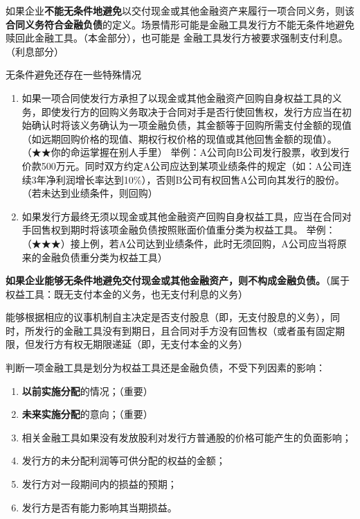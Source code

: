 \documentclass[UTF8,12pt]{ctexart}
\numberwithin{equation}{section} %
\numberwithin{figure}{section}
\numberwithin{table}{section}
\begin{document}
	如果企业\textbf{不能无条件地避免}以交付现金或其他金融资产来履行一项合同义务，则该\textbf{合同义务符合金融负债}的定义。场景情形可能是金融工具发行方不能无条件地避免赎回此金融工具。（本金部分），也可能是 金融工具发行方被要求强制支付利息。（利息部分）
	
	无条件避免还存在一些特殊情况
	\begin{enumerate}
		\item 如果一项合同使发行方承担了以现金或其他金融资产回购自身权益工具的义务，即使发行方的回购义务取决于合同对手是否行使回售权，发行方应当在初始确认时将该义务确认为一项金融负债，其金额等于回购所需支付金额的现值（如远期回购价格的现值、期权行权价格的现值或其他回售金额的现值）。（★★你的命运掌握在别人手里）
		举例：A公司向B公司发行股票，收到发行价款500万元。同时双方约定A公司应达到某项业绩条件的规定（如：A公司连续3年净利润增长率达到10\%），否则B公司有权回售A公司向其发行的股份。（若未达到业绩条件，则回购）
		
		\item 如果发行方最终无须以现金或其他金融资产回购自身权益工具，应当在合同对手回售权到期时将该项金融负债按照账面价值重分类为权益工具。
		举例：（★★★）接上例，若A公司达到业绩条件，此时无须回购，A公司应当将原来的金融负债重分类为权益工具）
	\end{enumerate}

	\textbf{如果企业能够无条件地避免交付现金或其他金融资产，则不构成金融负债。}（属于权益工具：既无支付本金的义务，也无支付利息的义务）
	
	能够根据相应的议事机制自主决定是否支付股息（即，无支付股息的义务），同时，所发行的金融工具没有到期日，且合同对手方没有回售权（或者虽有固定期限，但发行方有权无期限递延（即，无支付本金的义务）
	
	判断一项金融工具是划分为权益工具还是金融负债，不受下列因素的影响：
	\begin{enumerate}
		\item \textbf{以前实施分配}的情况；（重要）
		
		\item \textbf{未来实施分配}的意向；（重要）
		
		\item 相关金融工具如果没有发放股利对发行方普通股的价格可能产生的负面影响；
		
		\item 发行方的未分配利润等可供分配的权益的金额；
		
		\item 发行方对一段期间内的损益的预期；
		
		\item 发行方是否有能力影响其当期损益。
	\end{enumerate}
	
\end{document}
